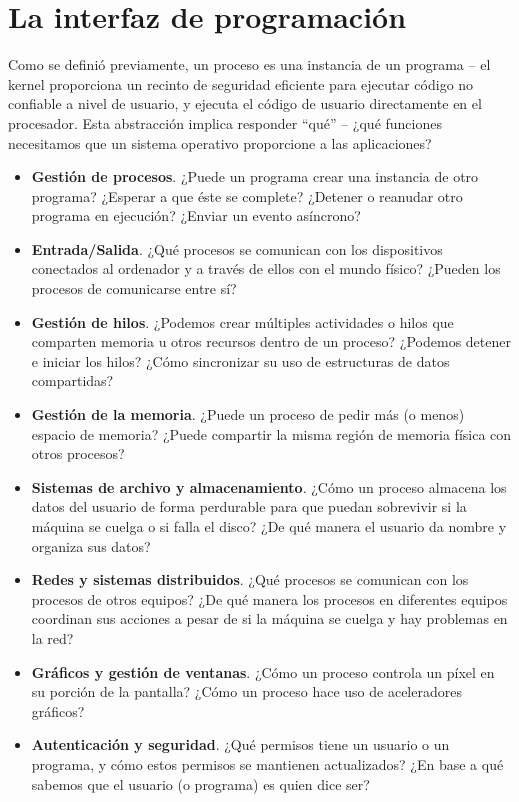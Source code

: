 \documentclass[10pt]{book}
\begin{document}
\chapter{La interfaz de programación}
Como se definió previamente, un proceso es una instancia de un programa -- el kernel proporciona un recinto de seguridad eficiente para ejecutar código no confiable a nivel de usuario, y ejecuta el código de usuario directamente en el procesador. Esta abstracción implica responder ``qué'' -- ¿qué funciones necesitamos que un sistema operativo proporcione a las aplicaciones?
\begin{itemize}
\item \textbf{Gestión de procesos}. ¿Puede un programa crear una instancia de otro programa? ¿Esperar a que éste se complete? ¿Detener o reanudar otro programa en ejecución? ¿Enviar un evento asíncrono?

\item \textbf{Entrada/Salida}. ¿Qué procesos se comunican con los dispositivos conectados al ordenador y a través de ellos con el mundo físico? ¿Pueden los procesos de comunicarse entre sí?

\item \textbf{Gestión de hilos}. ¿Podemos crear múltiples actividades o hilos que comparten memoria u otros recursos dentro de un proceso? ¿Podemos detener e iniciar los hilos? ¿Cómo sincronizar su uso de estructuras de datos compartidas?

\item \textbf{Gestión de la memoria}. ¿Puede un proceso de pedir más (o menos) espacio de memoria? ¿Puede compartir la misma región de memoria física con otros procesos?

\item \textbf{Sistemas de archivo y almacenamiento}. ¿Cómo un proceso almacena los datos del usuario de forma perdurable para que puedan sobrevivir si la máquina se cuelga o si falla el disco? ¿De qué manera el usuario da nombre y organiza sus datos?

\item \textbf{Redes y sistemas distribuidos}. ¿Qué procesos se comunican con los procesos de otros equipos? ¿De qué manera los procesos en diferentes equipos coordinan sus acciones a pesar de si la máquina se cuelga y hay problemas en la red?

\item \textbf{Gráficos y gestión de ventanas}. ¿Cómo un proceso controla un píxel en su porción de la pantalla? ¿Cómo un proceso hace uso de aceleradores gráficos?

\item \textbf{Autenticación y seguridad}. ¿Qué permisos tiene un usuario o un programa, y cómo estos permisos se mantienen actualizados? ¿En base a qué sabemos que el usuario (o programa) es quien dice ser?
\end{itemize}
\end{document}
